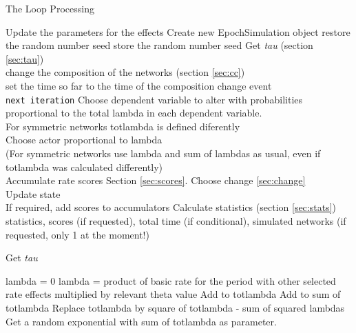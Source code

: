 \documentclass[12pt,a4paper]{article}
\makeatletter
\renewcommand{\=}{\,=\,}
\newcommand{\+}{\,+\,}
\newcommand{\nnm}[1]{\textsf{\small\textit{#1}}}
\renewcommand{\section}{\@startsection{section}{1}
                {0pt}{\baselineskip}{0.5\baselineskip}
                {\centering\sffamily} }
\renewcommand{\subsection}{\@startsection{subsection}{2}
                {0pt}{0.7\baselineskip}{0.3\baselineskip}
                {\sffamily} }
\makeatother
\begin{document}
\section{The Loop Processing}
\begin{algorithmic}
\STATE Update the parameters for the effects
\STATE Create new EpochSimulation object
\STATE restore the random number seed
\ELSE
\STATE store the random number seed
\ENDIF
\REPEAT
\STATE Get \nnm{tau} (section \ref{sec:tau})\\
\STATE change the composition of the networks (section \ref{sec:cc})\\
set the time so far to the time of the composition change event\\
\texttt{next iteration}
\ENDIF
\STATE Choose dependent variable to alter with probabilities
proportional to the total lambda in each dependent variable.\\
\STATE For symmetric networks totlambda is defined diferently\\
\STATE Choose actor proportional to lambda\\
(For symmetric networks use lambda and sum of lambdas as usual, even if
totlambda was calculated differently)\\
\IF{\nnm{deriv}}
\STATE Accumulate rate scores Section \ref{sec:scores}.
\ENDIF
Choose change \ref{sec:change}\\
Update state\\
If required, add scores to accumulators
\STATE Calculate statistics (section \ref{sec:stats})
\ENDFOR
\ENDFOR
\RETURN statistics, scores (if requested), total time (if conditional),
simulated networks (if requested, only 1 at the moment!)
\end{algorithmic}
\subsection{Get \nnm{tau}}
\label{sec:tau}
\begin{algorithmic}
\STATE lambda = 0
\ELSE
\STATE lambda = product of basic rate for the period with other
selected rate effects multiplied by relevant theta value
\ENDIF
\STATE Add to totlambda
\ENDFOR
\STATE Add to sum of totlambda
\ENDFOR
{}
\STATE Replace totlambda by square of totlambda - sum of squared lambdas
\ENDIF
\STATE Get a random exponential with sum of totlambda as parameter.\\
\end{algorithmic}
\end{document}

